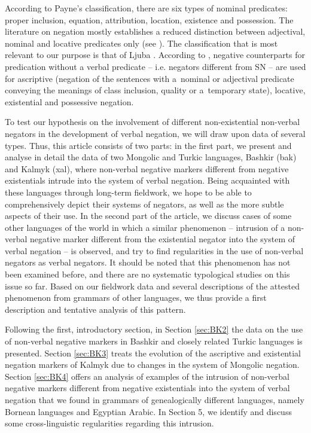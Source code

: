 \documentclass[output=paper]{langsci/langscibook}
\begin{document}
According to Payne’s \citeyearpar{Payne1997} classification, there are six types of nominal predicates: proper inclusion, equation, attribution, location, existence and possession. The literature on negation mostly establishes a reduced distinction between adjectival, nominal and locative predicates only (see \citealp{dryer2007a}). The classification that is most relevant to our purpose is that of Ljuba \citet{Veselinova2015}. According to \citet[550]{Veselinova2015}, negative counterparts for predication without a verbal predicate – i.e. negators different from SN – are used for ascriptive (negation of the sentences with a nominal or adjectival predicate conveying the meanings of class inclusion, quality or a temporary state), locative, existential and possessive negation.

To test our hypothesis on the involvement of different non-existential non-verbal negators in the development of verbal negation, we will draw upon data of several types. Thus, this article consists of two parts: in the first part, we present and analyse in detail the data of two Mongolic and Turkic languages, Bashkir (bak) and Kalmyk (xal), where non-verbal negative markers different from negative existentials intrude into the system of verbal negation. Being acquainted with these languages through long-term fieldwork, we hope to be able to comprehensively depict their systems of negators, as well as the more subtle aspects of their use. In the second part of the article, we discuss cases of some other languages of the world in which a similar phenomenon – intrusion of a non-verbal negative marker different from the existential negator into the system of verbal negation – is observed, and try to find regularities in the use of non-verbal negators as verbal negators. It should be noted that this phenomenon has not been examined before, and there are no systematic typological studies on this issue so far. Based on our fieldwork data and several descriptions of the attested phenomenon from grammars of other languages, we thus provide a first description and tentative analysis of this pattern.

Following the first, introductory section, in Section \ref{sec:BK2} the data on the use of non-verbal negative markers in Bashkir and closely related Turkic languages is presented. Section \ref{sec:BK3} treats the evolution of the ascriptive and existential negation markers of Kalmyk due to changes in the system of Mongolic negation. Section \ref{sec:BK4} offers an analysis of examples of the intrusion of non-verbal negative markers different from negative existentials into the system of verbal negation that we found in grammars of genealogically different languages, namely Bornean languages and Egyptian Arabic. In Section 5, we identify and discuss some cross-linguistic regularities regarding this intrusion.
\end{document}
